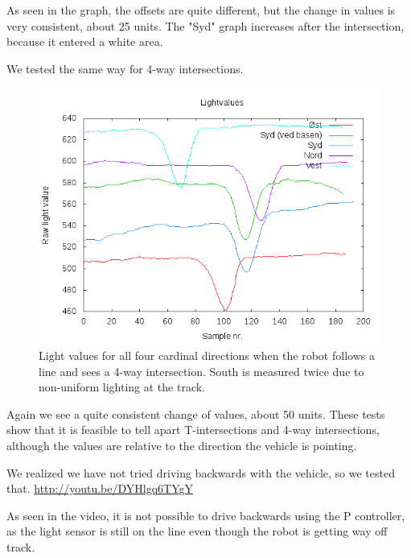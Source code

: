 As
seen in the graph, the offsets are quite different, but the change in
values is very consistent, about 25 units. The "Syd" graph increases after
the intersection, because it entered a white area.

We tested the same
way for 4-way intersections.

\begin{figure}[hbt]
  \centering
  \includegraphics[scale=0.5]{../experiments/2prototype/results/gnuplot/retningsbaseret_4vejs.png}
  \caption{Light values for all four cardinal directions when the robot follows a line and sees a 4-way intersection. South is measured twice due to non-uniform lighting at the track.}
\end{figure}

Again
we see a quite consistent change of values, about 50 units. These tests
show that it is feasible to tell apart T-intersections and 4-way
intersections, although the values are relative to the direction the
vehicle is pointing.

We realized we have not tried driving backwards with the vehicle, so we
tested that.
\url{http://youtu.be/DYHlgq6TYgY}

As seen in the video,
it is not possible to drive backwards using the P controller, as the
light sensor is still on the line even though the robot is getting way
off track.

